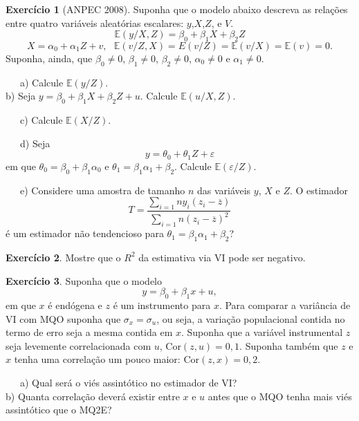 \documentclass[
]{book}
\theoremstyle{definition}
\theoremstyle{definition}
\theoremstyle{definition}
\newtheorem{exercise}{Exercício}[chapter]
\theoremstyle{remark}
\begin{document}
\begin{exercise}[ANPEC 2008]
\protect\hypertarget{exr:exvi13}{}{\label{exr:exvi13} {} }Suponha que o modelo abaixo descreva as relações entre quatro variáveis aleatórias escalares: \(y\),\(X\),\(Z\), e \(V\).
\[\mathbb{E}(y/X,Z)=\beta_0+\beta_1X+\beta_2Z\]
\[X=\alpha_0+\alpha_1Z+v,\,\,\,\,\mathbb{E}(v/Z,X)=E(v/Z)=\mathbb{E}(v/X)=\mathbb{E}(v)=0.\]
Suponha, ainda, que \(\beta_0\neq 0\), \(\beta_1\neq 0\), \(\beta_2\neq 0\), \(\alpha_0\neq 0\) e \(\alpha_1\neq 0\).

~~~a) Calcule \(\mathbb{E}(y/Z).\)\\
\hspace*{0.333em}\hspace*{0.333em}\hspace*{0.333em}b) Seja \(y=\beta_0+\beta_1X+\beta_2Z+u\). Calcule \(\mathbb{E}(u/X,Z)\).

~~~c) Calcule \(\mathbb{E}(X/Z)\).

~~~d) Seja \[y=\theta_0+\theta_1Z+\varepsilon\] em que \(\theta_0=\beta_0+\beta_1\alpha_0\) e \(\theta_1=\beta_1\alpha_1+\beta_2\). Calcule \(\mathbb{E}(\varepsilon/Z)\).

~~~e) Considere uma amostra de tamanho \(n\) das variáveis \(y\), \(X\) e \(Z\). O estimador \[T=\frac{\sum_{i=1}{n}y_i(z_i-\overline{z})}{\sum_{i=1}{n}(z_i-\overline{z})^2}\] é um estimador não tendencioso para \(\theta_1=\beta_1\alpha_1+\beta_2\)?
\end{exercise}

\begin{exercise}
\protect\hypertarget{exr:exvi14}{}{\label{exr:exvi14} }Mostre que o \(R^2\) da estimativa via VI pode ser negativo.
\end{exercise}

\begin{exercise}
\protect\hypertarget{exr:exvi15}{}{\label{exr:exvi15} }Suponha que o modelo \[ y=\beta_0+\beta_1x+u,\] em que \(x\) é endógena e \(z\) é um instrumento para \(x\).
Para comparar a variância de VI com MQO suponha que \(\sigma_x=\sigma_u\), ou seja, a variação populacional
contida no termo de erro seja a mesma contida em \(x\). Suponha que a variável instrumental \(z\) seja levemente correlacionada
com \(u\), \(\mbox{Cor}(z,u)=0,1.\) Suponha também que \(z\) e \(x\) tenha uma correlação um pouco maior: \(\mbox{Cor}(z,x)=0,2.\)

~~~a) Qual será o viés assintótico no estimador de VI?\\
\hspace*{0.333em}\hspace*{0.333em}\hspace*{0.333em}b) Quanta correlação deverá existir entre \(x\) e \(u\) antes que o MQO tenha mais viés assintótico que o MQ2E?
\end{exercise}

  
\end{document}
